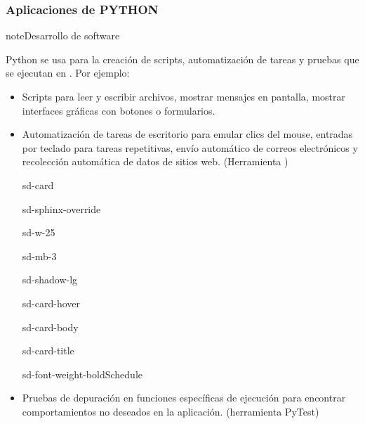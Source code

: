\documentclass[letterpaper,10pt,spanish]{sphinxmanual}
\begin{document}
\subsubsection{Aplicaciones de PYTHON}
\label{\detokenize{1_guias/10programacion/G1024:aplicaciones-de-python}}
\begin{sphinxadmonition}{note}{Desarrollo de software}

\sphinxAtStartPar
Python se usa para la creación de scripts, automatización de tareas y pruebas que se ejecutan en . Por ejemplo:
\begin{itemize}
\item {} 
\sphinxAtStartPar
Scripts para leer y escribir archivos, mostrar mensajes en pantalla, mostrar interfaces gráficas con botones o formularios.

\item {} 
\sphinxAtStartPar
Automatización de tareas de escritorio para emular clics del mouse, entradas por teclado para tareas repetitivas, envío automático de correos electrónicos y recolección automática de datos de sitios web. (Herramienta )

\begin{sphinxuseclass}{sd-card}
\begin{sphinxuseclass}{sd-sphinx-override}
\begin{sphinxuseclass}{sd-w-25}
\begin{sphinxuseclass}{sd-mb-3}
\begin{sphinxuseclass}{sd-shadow-lg}
\begin{sphinxuseclass}{sd-card-hover}
\begin{sphinxuseclass}{sd-card-body}
\begin{sphinxuseclass}{sd-card-title}
\begin{sphinxuseclass}{sd-font-weight-bold}Schedule
\end{sphinxuseclass}
\end{sphinxuseclass}
\end{sphinxuseclass}
\noindent{}
\end{sphinxuseclass}
\end{sphinxuseclass}
\end{sphinxuseclass}
\end{sphinxuseclass}
\end{sphinxuseclass}
\end{sphinxuseclass}
\item {} 
\sphinxAtStartPar
Pruebas de depuración en funciones específicas de ejecución para encontrar comportamientos no deseados en la aplicación. (herramienta PyTest)


\end{itemize}
\end{sphinxadmonition}
\end{document}
